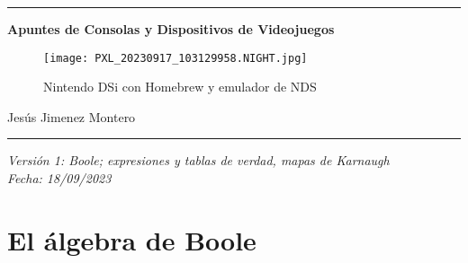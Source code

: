 \documentclass[12pt]{article}
\date{}
\begin{document}
\nocite{atkinson}
        \begin{center}
             
         
        \hrule
        \vspace{1cm}
        \vspace{1cm}
        {\bfseries\huge Apuntes de Consolas y Dispositivos de Videojuegos \par}
        \vspace{2cm}

        \begin{figure}[H]
            \centering
            \texttt{[image: PXL\_20230917\_103129958.NIGHT.jpg]}
            \caption{Nintendo DSi con Homebrew y emulador de NDS}
            \label{fig:dsi}
        \end{figure}
        
        {\large 
        Jesús Jimenez Montero \\
        \par}
        \vspace{1cm}
        \hrule
        \vspace{1cm}

        {\large 
        \textit{Versión 1: Boole; expresiones y tablas de verdad, mapas de Karnaugh\\
        Fecha: 18/09/2023}
        \par}
        \end{center}

\newpage
\renewcommand{\contentsname}{Tabla de contenidos}
\setcounter{secnumdepth}{5}
\tableofcontents
\setcounter{tocdepth}{4}

\newpage
\newpage
\renewcommand{\listfigurename}{Lista de figuras}
\thispagestyle{empty}
\listoffigures
\newpage

\renewcommand{\listtablename}{Lista de tablas}
\listoftables
\newpage


\section{El álgebra de Boole}
\end{document}
